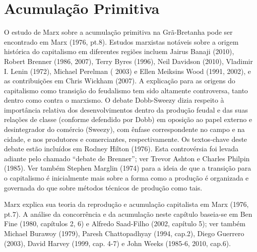 \section{Acumulação Primitiva}
 \par 
O estudo de Marx sobre a acumulação primitiva na Grã-Bretanha pode ser encontrado em Marx (1976, pt.{\color{blue}8}). Estudos marxistas notáveis ​​​​sobre a origem histórica do capitalismo em diferentes regiões incluem Jairus Banaji (2010), Robert Brenner (1986, 2007), Terry Byres (1996), Neil Davidson (2010), Vladimir I. Lenin (1972), Michael Perelman ( 2003) e Ellen Meiksins Wood (1991, 2002), e as contribuições em Chris Wickham (2007). A explicação para as origens do capitalismo como transição do feudalismo tem sido altamente controversa, tanto dentro como contra o marxismo. O debate Dobb-Sweezy dizia respeito à importância relativa dos desenvolvimentos dentro da produção feudal e das suas relações de classe (conforme defendido por Dobb) em oposição ao papel externo e desintegrador do comércio (Sweezy), com ênfase correspondente no campo e na cidade, e nos produtores e comerciantes, respectivamente. Os textos-chave deste debate estão incluídos em Rodney Hilton (1976). Esta controvérsia foi levada adiante pelo chamado “debate de Brenner”; ver Trevor Ashton e Charles Philpin (1985). Ver também Stephen Marglin (1974) para a ideia de que a transição para o capitalismo é inicialmente mais sobre a forma como a produção é organizada e governada do que sobre métodos técnicos de produção como tais.
 \par 
Marx explica sua teoria da reprodução e acumulação capitalista em Marx (1976, pt.{\color{blue}7}). A análise da concorrência e da acumulação neste capítulo baseia-se em Ben Fine (1980, capítulos 2, {\color{blue}6}) e Alfredo Saad-Filho (2002, capítulo {\color{blue}5}); ver também Michael Burawoy (1979), Paresh Chattopadhyay (1994, cap.{\color{blue}2}), Diego Guerrero (2003), David Harvey (1999, cap. 4-7) e John Weeks (1985-6, 2010, cap.{\color{blue}6}).